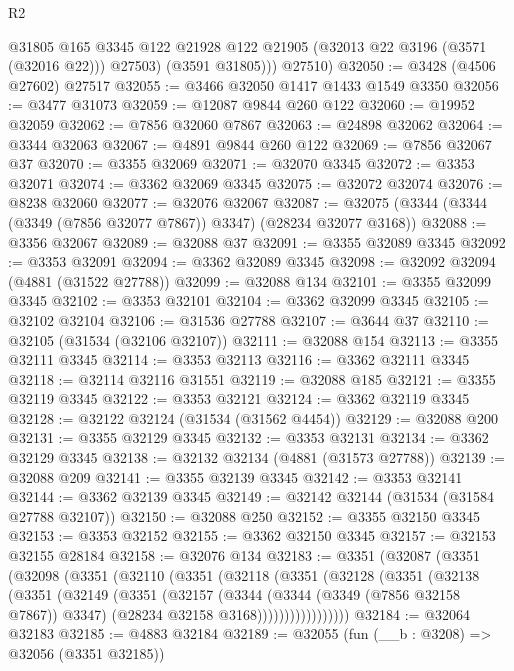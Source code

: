 \begin{lexlean}{R2}
\begin{coremodule}
            @31805
            @165
            @3345
            @122
            @21928
            @122
            @21905
            (@32013 @22 @3196 (@3571 (@32016 @22)))
            @27503)
          (@3591 @31805)))
      @27510)
@32050 := @3428 (@4506 @27602) @27517
@32055 := @3466 @32050 @1417 @1433 @1549 @3350
@32056 := @3477 @31073
@32059 := @12087 @9844 @260 @122
@32060 := @19952 @32059
@32062 := @7856 @32060 @7867
@32063 := @24898 @32062
@32064 := @3344 @32063
@32067 := @4891 @9844 @260 @122
@32069 := @7856 @32067 @37
@32070 := @3355 @32069
@32071 := @32070 @3345
@32072 := @3353 @32071
@32074 := @3362 @32069 @3345
@32075 := @32072 @32074
@32076 := @8238 @32060
@32077 := @32076 @32067
@32087 := @32075 (@3344 (@3344 (@3349 (@7856 @32077 @7867)) @3347) (@28234 @32077 @3168))
@32088 := @3356 @32067
@32089 := @32088 @37
@32091 := @3355 @32089 @3345
@32092 := @3353 @32091
@32094 := @3362 @32089 @3345
@32098 := @32092 @32094 (@4881 (@31522 @27788))
@32099 := @32088 @134
@32101 := @3355 @32099 @3345
@32102 := @3353 @32101
@32104 := @3362 @32099 @3345
@32105 := @32102 @32104
@32106 := @31536 @27788
@32107 := @3644 @37
@32110 := @32105 (@31534 (@32106 @32107))
@32111 := @32088 @154
@32113 := @3355 @32111 @3345
@32114 := @3353 @32113
@32116 := @3362 @32111 @3345
@32118 := @32114 @32116 @31551
@32119 := @32088 @185
@32121 := @3355 @32119 @3345
@32122 := @3353 @32121
@32124 := @3362 @32119 @3345
@32128 := @32122 @32124 (@31534 (@31562 @4454))
@32129 := @32088 @200
@32131 := @3355 @32129 @3345
@32132 := @3353 @32131
@32134 := @3362 @32129 @3345
@32138 := @32132 @32134 (@4881 (@31573 @27788))
@32139 := @32088 @209
@32141 := @3355 @32139 @3345
@32142 := @3353 @32141
@32144 := @3362 @32139 @3345
@32149 := @32142 @32144 (@31534 (@31584 @27788 @32107))
@32150 := @32088 @250
@32152 := @3355 @32150 @3345
@32153 := @3353 @32152
@32155 := @3362 @32150 @3345
@32157 := @32153 @32155 @28184
@32158 := @32076 @134
@32183 := @3351
    (@32087
      (@3351
        (@32098
          (@3351
            (@32110
              (@3351
                (@32118
                  (@3351
                    (@32128
                      (@3351
                        (@32138
                          (@3351
                            (@32149
                              (@3351
                                (@32157
                                  (@3344
                                    (@3344 (@3349 (@7856 @32158 @7867)) @3347)
                                    (@28234 @32158 @3168)))))))))))))))))
@32184 := @32064 @32183
@32185 := @4883 @32184
@32189 := @32055 (fun (__b : @3208) => @32056 (@3351 @32185))

\end{coremodule}
\end{lexlean}
